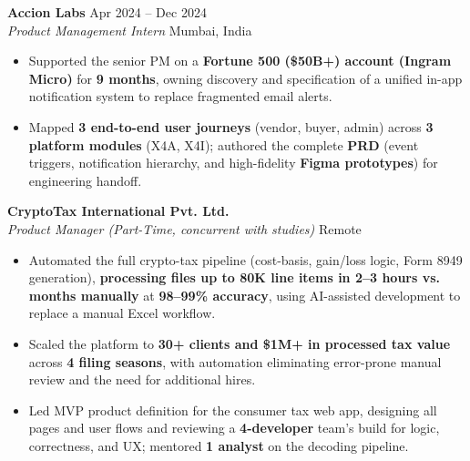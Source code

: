 \documentclass[10pt,a4paper]{article}
\begin{document}
\textbf{Accion Labs} \hfill Apr 2024 -- Dec 2024 \\
\textit{Product Management Intern} \hfill Mumbai, India
\begin{itemize}[noitemsep]
    \item Supported the senior PM on a \textbf{Fortune 500 (\$50B+) account (Ingram Micro)} for \textbf{9 months}, owning discovery and specification of a unified in-app notification system to replace fragmented email alerts.
    \item Mapped \textbf{3 end-to-end user journeys} (vendor, buyer, admin) across \textbf{3 platform modules} (X4A, X4I); authored the complete \textbf{PRD} (event triggers, notification hierarchy, and high-fidelity \textbf{Figma prototypes}) for engineering handoff.
\end{itemize}

\textbf{CryptoTax International Pvt. Ltd.} \hfill \\
\textit{Product Manager (Part-Time, concurrent with studies)} \hfill Remote
\begin{itemize}[noitemsep]
    \item Automated the full crypto-tax pipeline (cost-basis, gain/loss logic, Form 8949 generation), \textbf{processing files up to 80K line items in 2--3 hours vs. months manually} at \textbf{98--99\% accuracy}, using AI-assisted development to replace a manual Excel workflow.
    \item Scaled the platform to \textbf{30+ clients and \$1M+ in processed tax value} across \textbf{4 filing seasons}, with automation eliminating error-prone manual review and the need for additional hires.
    \item Led MVP product definition for the consumer tax web app, designing all pages and user flows and reviewing a \textbf{4-developer} team's build for logic, correctness, and UX; mentored \textbf{1 analyst} on the decoding pipeline.
\end{itemize}
\end{document}

